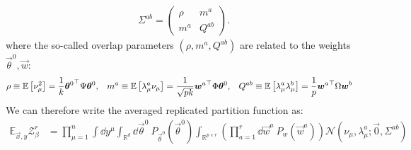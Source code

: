 \documentclass[11pt]{article}
\numberwithin{equation}{section}
\begin{document}
\begin{align}
\Sigma^{ab} = 
\begin{pmatrix}
 	\rho & m^{a}\\
 	m^{a} & Q^{ab}
\end{pmatrix}.
\end{align}
\noindent where the so-called overlap parameters $(\rho, m^{a}, Q^{ab})$ are related to the weights $\vec{\theta}^{0}, \vec{w}$:
\begin{align}
\rho &\equiv \mathbb{E}\left[\nu_{\mu}^2\right] = \frac{1}{k}{\vec{\theta}^{0}}^{\top}\Psi\vec{\theta}^{0}, && m^{a} \equiv \mathbb{E}\left[\lambda_{\mu}^{a}\nu_{\mu}\right]= \frac{1}{\sqrt{pk}}{\vec{w}^{a}}^{\top}\Phi\vec{\theta}^{0}, && Q^{ab} \equiv \mathbb{E}\left[\lambda_{\mu}^{a}\lambda_{\mu}^{b}\right]= \frac{1}{p}{\vec{w}^{a}}^{\top}\Omega \vec{w}^{b}	\notag
\end{align}
We can therefore write the averaged replicated partition function as:
\begin{align}
\mathbb{E}_{\vec{x},y}\mathcal{Z}^{r}_{\beta} &=\prod\limits_{\mu=1}^{n}\int\dd y^{\mu}\int_{\mathbb{R}^{d}}\dd\vec{\theta}^{0}~P_{\vec{\theta}^{0}}(\vec{\theta}^{0})	\int_{\mathbb{R}^{p\times r}}\left(\prod\limits_{a=1}^{r}\dd\vec{w}^{a}~P_{w}(\vec{w}^{a})\right)\mathcal{N}(\nu_{\mu}, \lambda^{a}_{\mu};\vec{0},\Sigma^{ab})
\label{eq:avgZr:2}
\end{align}

\end{document}
